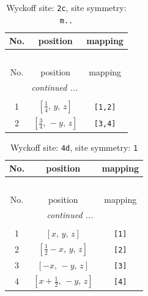 \documentclass[fleqn,8pt]{jsarticle}
\begin{document}
\begin{longtable}{ccc}
\caption{Wyckoff site: {\tt 2c}, site symmetry: {\tt m..}}
 \\
 \hline \hline
No. & position & mapping \\ \hline \endfirsthead

\multicolumn{2}{l}{\tablename\ \thetable{}} \\
 \hline \hline
No. & position & mapping \\ \hline \endhead

 \hline \hline
\multicolumn{2}{r}{\footnotesize\it continued ...} \\ \endfoot

 \hline \hline
\multicolumn{2}{r}{} \\ \endlastfoot

1 & $\left[ \frac{1}{4},\, y,\, z \right]$ & {\tt [1,2]} \\ \hline
2 & $\left[ \frac{3}{4},\, - y,\, z \right]$ & {\tt [3,4]} \\
\end{longtable}
\renewcommand{\arraystretch}{1.2}
\begin{longtable}{ccc}
\caption{Wyckoff site: {\tt 4d}, site symmetry: {\tt 1}}
 \\
 \hline \hline
No. & position & mapping \\ \hline \endfirsthead

\multicolumn{2}{l}{\tablename\ \thetable{}} \\
 \hline \hline
No. & position & mapping \\ \hline \endhead

 \hline \hline
\multicolumn{2}{r}{\footnotesize\it continued ...} \\ \endfoot

 \hline \hline
\multicolumn{2}{r}{} \\ \endlastfoot

1 & $\left[ x,\, y,\, z \right]$ & {\tt [1]} \\ \hline
2 & $\left[ \frac{1}{2} - x,\, y,\, z \right]$ & {\tt [2]} \\ \hline
3 & $\left[ - x,\, - y,\, z \right]$ & {\tt [3]} \\ \hline
4 & $\left[ x + \frac{1}{2},\, - y,\, z \right]$ & {\tt [4]} \\
\end{longtable}
\end{document}
